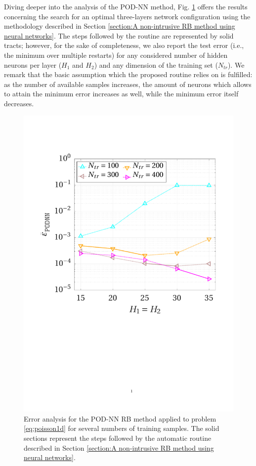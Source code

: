 \documentclass[longtitle]{elsarticle}
\numberwithin{equation}{section}
\theoremstyle{theorem}
\theoremstyle{definition}
\theoremstyle{remark}
\theoremstyle{proposition}
\numberwithin{figure}{section}
\begin{document}
		Diving deeper into the analysis of the POD-NN method, Fig. \ref{fig:poisson1d-fig3} offers the results concerning the search for an optimal three-layers network configuration using the methodology described in Section \ref{section:A non-intrusive RB method using neural networks}. The steps followed by the routine are represented by solid tracts; however, for the sake of completeness, we also report the test error (i.e., the minimum over multiple restarts) for any considered number of hidden neurons per layer ($H_1$ and $H_2$) and any dimension of the training set ($N_{tr}$). We remark that the basic assumption which the proposed routine relies on is fulfilled: as the number of available samples increases, the amount of neurons which allows to attain the minimum error increases as well, while the minimum error itself decreases.
		
		\begin{figure}[t!]
			\center
			\includegraphics[scale = 0.4, trim = {1cm 9.8cm 1.5cm 3.5cm}, clip]{poisson1d_3_nn_convergence}
			
			\caption{Error analysis for the POD-NN RB method applied to problem \eqref{eq:poisson1d} for several numbers of training samples. The solid sections represent the steps followed by the automatic routine described in Section \ref{section:A non-intrusive RB method using neural networks}.}
			\label{fig:poisson1d-fig3}
		\end{figure}
				
\end{document}
